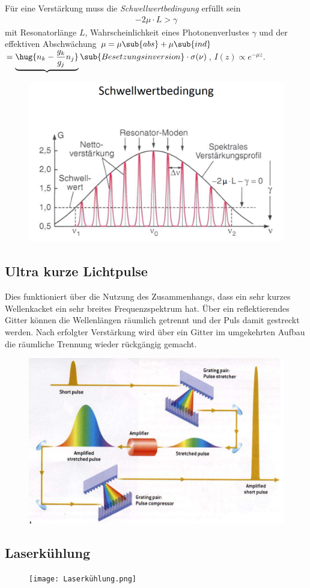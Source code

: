 \documentclass[twocolumn]{summery_4.1}
\begin{document}
Für eine Verstärkung muss die \emph{Schwellwertbedingung} erfüllt sein 
\begin{align*}
    -2\mu \cdot L > \gamma 
\end{align*}
mit Resonatorlänge \(L\), Wahrscheinlichkeit eines Photonenverlustes \(\gamma\) und der effektiven Abschwächung \(\mu = \mu\sub{abs}+\mu\sub{ind}\)
\(= \underbrace{\hug{n_k - \frac{g_k}{g_j}n_j}}\sub{Besetzungsinversion}\cdot \sigma(\nu)\), \(I(z)\propto e^{-\mu z}\).

\begin{figure}[H]
    \centering
    \includegraphics[width=.49\textwidth]{Schwellwertbedingung.png}
\end{figure}

\subsection{Ultra kurze Lichtpulse}
Dies funktioniert über die Nutzung des Zusammenhangs, dass ein sehr kurzes Wellenkacket ein sehr breites Frequenzspektrum hat. Über ein reflektierendes Gitter können die Wellenlängen räumlich getrennt und der
Puls damit gestreckt werden. Nach erfolgter Verstärkung wird über ein Gitter im umgekehrten Aufbau die räumliche Trennung wieder rückgängig gemacht.

\begin{figure}[H]
    \centering
    \includegraphics[width=.49\textwidth]{Kurzer_Puls.png}
\end{figure}

\subsection{Laserkühlung}
\begin{figure}[H]
    \centering
    \texttt{[image: Laserkühlung.png]}
\end{figure}
\end{document}
